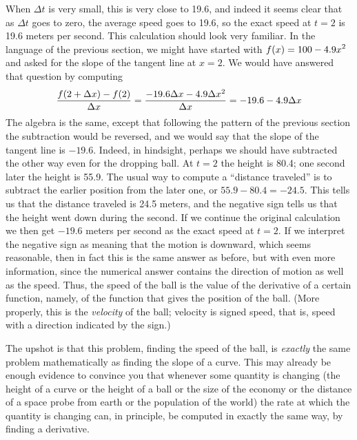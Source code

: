When $\Delta t$ is very small, this is very close to 19.6, and indeed
it seems clear that as $\Delta t$ goes to zero, the average speed goes
to 19.6, so the exact speed at $t=2$ is 19.6 meters per second. This
calculation should look very familiar. In the language of the previous
section, we might have started with $\displaystyle f(x)=100-4.9x^2$ and asked for
the slope of the tangent line at $x=2$. We would have answered that
question by computing
$$
{f(2+\Delta x) - f(2)\over \Delta x}
={-19.6\Delta x-4.9\Delta x^2\over \Delta x}
=-19.6-4.9\Delta x
$$ The algebra is the same, except that following the pattern of the
previous section the subtraction would be reversed, and we would say
that the slope of the tangent line is $-19.6$. Indeed, in hindsight,
perhaps we should have subtracted the other way even for the dropping
ball. At $t=2$ the height is 80.4; one second later the height is
55.9. The usual way to compute a ``distance traveled'' is to subtract
the earlier position from the later one, or $55.9-80.4=-24.5$. This
tells us that the distance traveled is 24.5 meters, and the negative
sign tells us that the height went down during the second. If we
continue the original calculation we then get $-19.6$ meters per
second as the exact speed at $t=2$. If we interpret the negative sign
as meaning that the motion is downward, which seems reasonable, then
in fact this is the same answer as before, but with even more
information, since the numerical answer contains the direction of
motion as well as the speed. Thus, the speed of the ball is the value
of the derivative of a certain function, namely, of the function that
gives the position of the ball. (More properly, this is the {\em
  velocity\/} of the ball; velocity is signed speed,
that is, speed with a direction indicated by the sign.)

The upshot is that this problem, finding the speed of the ball, is
{\it exactly\/} the same problem mathematically as finding the slope
of a curve. This may already be enough evidence to convince you that
whenever some quantity is changing (the height of a curve or the
height of a ball or the size of the economy or the distance of a space
probe from earth or the population of the world) the rate at which the
quantity is changing can, in principle, be computed in exactly the
same way, by finding a derivative.

